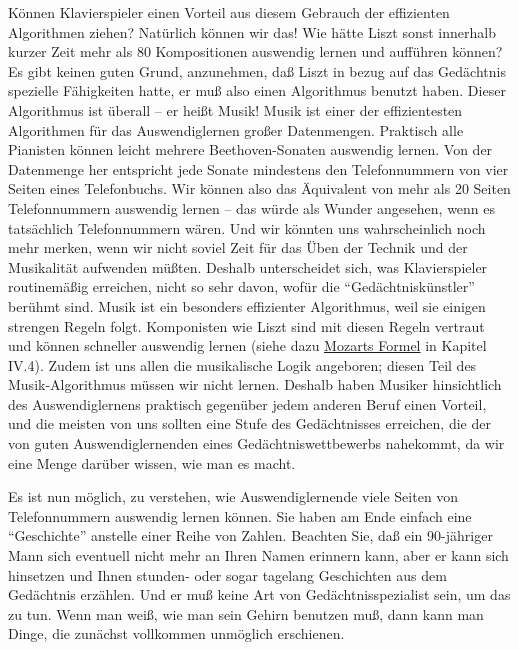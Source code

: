 Können Klavierspieler einen Vorteil aus diesem Gebrauch der effizienten Algorithmen ziehen?
Natürlich können wir das!
Wie hätte Liszt sonst innerhalb kurzer Zeit mehr als 80 Kompositionen auswendig lernen und aufführen können?
Es gibt keinen guten Grund, anzunehmen, daß Liszt in bezug auf das Gedächtnis spezielle Fähigkeiten hatte, er muß also einen Algorithmus benutzt haben.
Dieser Algorithmus ist überall -- er heißt Musik!
Musik ist einer der effizientesten Algorithmen für das Auswendiglernen großer Datenmengen.
Praktisch alle Pianisten können leicht mehrere Beethoven-Sonaten auswendig lernen.
Von der Datenmenge her entspricht jede Sonate mindestens den Telefonnummern von vier Seiten eines Telefonbuchs.
Wir können also das Äquivalent von mehr als 20 Seiten Telefonnummern auswendig lernen -- das würde als Wunder angesehen, wenn es tatsächlich Telefonnummern wären.
Und wir könnten uns wahrscheinlich noch mehr merken, wenn wir nicht soviel Zeit für das Üben der Technik und der Musikalität aufwenden müßten.
Deshalb unterscheidet sich, was Klavierspieler routinemäßig erreichen, nicht so sehr davon, wofür die \enquote{Gedächtniskünstler} berühmt sind.
Musik ist ein besonders effizienter Algorithmus, weil sie einigen strengen Regeln folgt.
Komponisten wie Liszt sind mit diesen Regeln vertraut und können schneller auswendig lernen (siehe dazu \hyperref[c1iv4]{Mozarts Formel} in Kapitel IV.4).
Zudem ist uns allen die musikalische Logik angeboren; diesen Teil des Musik-Algorithmus müssen wir nicht lernen.
Deshalb haben Musiker hinsichtlich des Auswendiglernens praktisch gegenüber jedem anderen Beruf einen Vorteil, und die meisten von uns sollten eine Stufe des Gedächtnisses erreichen, die der von guten Auswendiglernenden eines Gedächtniswettbewerbs nahekommt, da wir eine Menge darüber wissen, wie man es macht.

Es ist nun möglich, zu verstehen, wie Auswendiglernende viele Seiten von Telefonnummern auswendig lernen können.
Sie haben am Ende einfach eine \enquote{Geschichte} anstelle einer Reihe von Zahlen.
Beachten Sie, daß ein 90-jähriger Mann sich eventuell nicht mehr an Ihren Namen erinnern kann, aber er kann sich hinsetzen und Ihnen stunden- oder sogar tagelang Geschichten aus dem Gedächtnis erzählen.
Und er muß keine Art von Gedächtnisspezialist sein, um das zu tun.
Wenn man weiß, wie man sein Gehirn benutzen muß, dann kann man Dinge, die zunächst vollkommen unmöglich erschienen.

